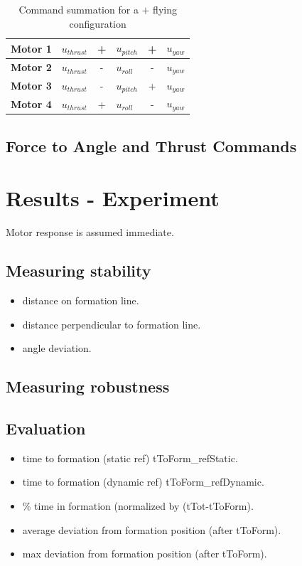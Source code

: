 \documentclass[a4paper, 12pt]{report}
\begin{document}
\begin{table}[htdp]
\caption{Command summation for a $+$  flying configuration}
\centering
\begin{tabular}{|l|l c l c l|}
\hline
\textbf{Motor 1} & $u_{thrust}$ & + &$u_{pitch}$ & + & $u_{yaw}$\\
\hline
\hline
\textbf{Motor 2} & $u_{thrust}$ & - & $u_{roll}$ & - & $u_{yaw}$ \\
\hline
\hline
\textbf{Motor 3} & $u_{thrust}$ & - & $u_{pitch}$ & + & $u_{yaw}$\\
\hline
\hline
\textbf{Motor 4} & $u_{thrust}$ & + & $u_{roll}$ & - & $u_{yaw}$ \\
\hline
\end{tabular}
\label{tab:motorDistribution}
\end{table}

\subsection{Force to Angle and Thrust Commands}

\newpage
\section{Results - Experiment}
Motor response is assumed immediate.
\subsection{Measuring stability}
\cite{Mataric2002}
\begin{itemize}
\item distance on formation line.
\item distance perpendicular to formation line.
\item angle deviation.
\end{itemize}

\subsection{Measuring robustness}

\subsection{Evaluation}
\begin{itemize}
\item time to formation (static ref) tToForm\_refStatic.
\item time to formation (dynamic ref) tToForm\_refDynamic.
\item \% time in formation (normalized by (tTot-tToForm).
\item average deviation from formation position (after tToForm).
\item max deviation from formation position (after tToForm).

\end{itemize}
\end{document}
